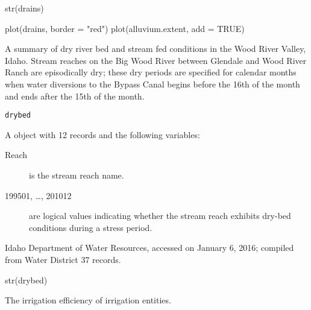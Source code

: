 \documentclass[letterpaper]{book}
\begin{document}
%
\begin{Examples}
\begin{ExampleCode}
str(drains)

plot(drains, border = "red")
plot(alluvium.extent, add = TRUE)
\end{ExampleCode}
\end{Examples}
%
\begin{Description}\relax
A summary of dry river bed and stream fed conditions in the Wood River Valley, Idaho.
Stream reaches on the Big Wood River between Glendale and Wood River Ranch are episodically dry;
these dry periods are specified for calendar months when water diversions to the Bypass Canal begins before the 16th of the month and ends after the 15th of the month.
\end{Description}
%
\begin{Usage}
\begin{verbatim}
drybed
\end{verbatim}
\end{Usage}
%
\begin{Format}
A  object with 12 records and the following variables:
\begin{description}

\item[Reach] is the stream reach name.
\item[199501, \dots, 201012] are logical values indicating whether the stream reach exhibits dry-bed conditions during a stress period.

\end{description}

\end{Format}
%
\begin{Source}\relax
Idaho Department of Water Resources, accessed on January 6, 2016;
compiled from Water District 37 records.
\end{Source}
%
\begin{Examples}
\begin{ExampleCode}
str(drybed)
\end{ExampleCode}
\end{Examples}
%
\begin{Description}\relax
The irrigation efficiency of irrigation entities.
\end{Description}
\end{document}
